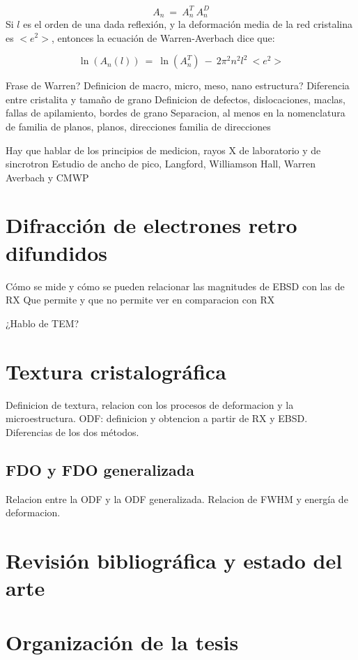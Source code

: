 \begin{equation}
  A_n \ = \ A_n^T \ A_n^D
  \label{eq:FCoeff}
\end{equation}
\noindent
Si $l$ es el orden de una dada reflexión, y la deformación media de la red cristalina es $<e^2>$, entonces la ecuación de Warren-Averbach dice que:

\begin{equation}
  \ln(A_n(l)) \ = \ \ln(A_n^T) \ - \ 2 \pi^2 n^2 l^2 \ <e^2>
  \label{eq:WAPlot}
\end{equation}
\noindent




Frase de Warren?
Definicion de macro, micro, meso, nano estructura?
Diferencia entre cristalita y tamaño de grano
Definicion de defectos, dislocaciones, maclas, fallas de apilamiento, bordes de grano
Separacion, al menos en la nomenclatura de familia de planos, planos, direcciones familia de direcciones

Hay que hablar de los principios de medicion, rayos X de laboratorio y de sincrotron
Estudio de ancho de pico, Langford, Williamson Hall, Warren Averbach y CMWP

\section{Difracción de electrones retro difundidos}\label{S:EBSD}
Cómo se mide y cómo se pueden relacionar las magnitudes de EBSD con las de RX
Que permite y que no permite ver en comparacion con RX

¿Hablo de TEM?
 
\section{Textura cristalográfica}\label{S:Text}
Definicion de textura, relacion con los procesos de deformacion y la microestructura.
ODF: definicion y obtencion a partir de RX y EBSD. Diferencias de los dos métodos.

\subsection{FDO y FDO generalizada}\label{SS:ODF}
Relacion entre la ODF y la ODF generalizada. Relacion de FWHM y energía de deformacion.

\section{Revisión bibliográfica y estado del arte}\label{S:RB}

\section{Organización de la tesis}\label{S:Org}
